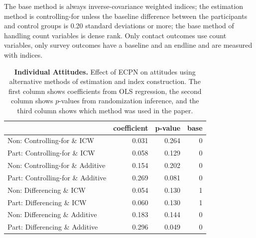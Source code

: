 \documentclass[
]{article}
\begin{document}
The base method is always inverse-covariance weighted indices; the
estimation method is controlling-for unless the baseline difference
between the participants and control groups is 0.20 standard deviations
or more; the base method of handling count variables is dense rank. Only
contact outcomes use count variables, only survey outcomes have a
baseline and an endline and are measured with indices.

\begin{table}[H]
\begin{center}
\label{tab:attitude_tab_ind}
\caption{\textbf{Individual Attitudes.} Effect of ECPN on attitudes using alternative methods of estimation and index construction. The first column shows coefficients from OLS regression, the second column shows $p$-values from randomization inference, and the third column shows which method was used in the paper.}
\smallskip

\begin{tabular}{l|r|r|r}
\hline
  & coefficient & p-value & base\\
\hline
Non: Controlling-for \& ICW & 0.031 & 0.264 & 0\\
\hline
Part: Controlling-for \& ICW & 0.058 & 0.129 & 0\\
\hline
Non: Controlling-for \& Additive & 0.154 & 0.202 & 0\\
\hline
Part: Controlling-for \& Additive & 0.269 & 0.081 & 0\\
\hline
Non: Differencing \& ICW & 0.054 & 0.130 & 1\\
\hline
Part: Differencing \& ICW & 0.060 & 0.130 & 1\\
\hline
Non: Differencing \& Additive & 0.183 & 0.144 & 0\\
\hline
Part: Differencing \& Additive & 0.296 & 0.049 & 0\\
\hline
\end{tabular}


\end{center}
\end{table}
\end{document}
